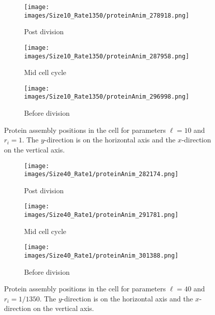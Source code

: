 \begin{figure}[htbp]
    \centering
    \begin{subfigure}[b]{\textwidth}
        \centering
        \texttt{[image: images/Size10\_Rate1350/proteinAnim\_278918.png]}
        \caption{Post division}
        \label{subfig:10_1350_post}
    \end{subfigure}
    \hfill
    \begin{subfigure}[b]{\textwidth}
        \centering
        \texttt{[image: images/Size10\_Rate1350/proteinAnim\_287958.png]}
        \caption{Mid cell cycle}
        \label{subfig:10_1350_mid}
    \end{subfigure}
    \vfill
    \begin{subfigure}[b]{\textwidth}
        \centering
        \texttt{[image: images/Size10\_Rate1350/proteinAnim\_296998.png]}
        \caption{Before division}
        \label{subfig:10_1350_pre}
    \end{subfigure}
    \caption{
    Protein assembly positions in the cell for parameters $\ell=10$ and $r_i=1$. The $y$-direction is on the horizontal axis and the $x$-direction on the vertical axis.
    }
    \label{fig:10_1350_cellcycle}
\end{figure}

\begin{figure}[htbp]
    \centering
    \begin{subfigure}[b]{\textwidth}
        \centering
        \texttt{[image: images/Size40\_Rate1/proteinAnim\_282174.png]}
        \caption{Post division}
        \label{subfig:40_1_post}
    \end{subfigure}
    \vfill
    \begin{subfigure}[b]{\textwidth}
        \centering
        \texttt{[image: images/Size40\_Rate1/proteinAnim\_291781.png]}
        \caption{Mid cell cycle}
        \label{subfig:40_1_mid}
    \end{subfigure}
    \vfill
    \begin{subfigure}[b]{\textwidth}
        \centering
        \texttt{[image: images/Size40\_Rate1/proteinAnim\_301388.png]}
        \caption{Before division}
        \label{subfig:40_1_pre}
    \end{subfigure}
    \caption{
    Protein assembly positions in the cell for parameters $\ell=40$ and $r_i=1/1350$. The $y$-direction is on the horizontal axis and the $x$-direction on the vertical axis.
    }
    \label{fig:40_1_cellcycle}
\end{figure}

